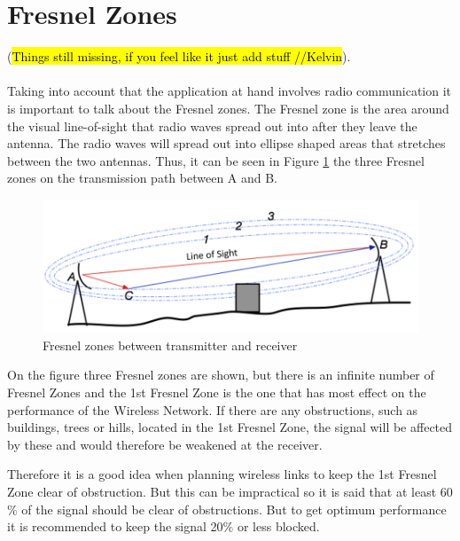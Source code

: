 \newpage

\section{Fresnel Zones}\label{sec:fresnel}
(\hl{Things still missing, if you feel like it just add stuff //Kelvin}). \\\\

\noindent Taking into account that the application at hand involves radio communication it is important to talk about the Fresnel zones. The Fresnel zone is the area around the visual line-of-sight that radio waves spread out into after they leave the antenna. The radio waves will spread out into ellipse shaped areas that stretches between the two antennas. Thus, it can be seen in Figure \ref{fig:fresnel_zones} the three Fresnel zones on the transmission path between A and B. 

\begin{figure}[H]
	\centering
	\includegraphics[scale=0.65]{figures/fresnel_zones.png}
	\caption{Fresnel zones between transmitter and receiver}
	\label{fig:fresnel_zones}
\end{figure}

On the figure three Fresnel zones are shown, but there is an infinite number of Fresnel Zones and the 1st Fresnel Zone is the one that has most effect on the performance of the Wireless Network. If there are any obstructions, such as buildings, trees or hills, located in the 1st Fresnel Zone, the signal will be affected by these and would therefore be weakened at the receiver.

Therefore it is a good idea when planning wireless links to keep the 1st Fresnel Zone clear of obstruction. But this can be impractical so it is said that at least 60 $\%$ of the signal should be clear of obstructions. But to get optimum performance it is recommended to keep the signal 20$\%$ or less blocked. \\
%
%
%
%
